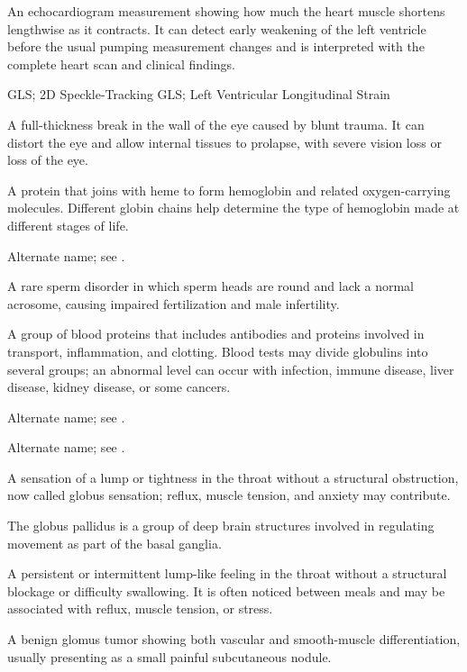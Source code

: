  An echocardiogram measurement showing how much the heart muscle shortens lengthwise as it contracts. It can detect early weakening of the left ventricle before the usual pumping measurement changes and is interpreted with the complete heart scan and clinical findings.

\synonyms
GLS; 2D Speckle-Tracking GLS; Left Ventricular Longitudinal Strain

 A full-thickness break in the wall of the eye caused by blunt trauma. It can distort the eye and allow internal tissues to prolapse, with severe vision loss or loss of the eye.

 A protein that joins with heme to form hemoglobin and related oxygen-carrying molecules. Different globin chains help determine the type of hemoglobin made at different stages of life.

 Alternate name; see .

 A rare sperm disorder in which sperm heads are round and lack a normal acrosome, causing impaired fertilization and male infertility.

 A group of blood proteins that includes antibodies and proteins involved in transport, inflammation, and clotting. Blood tests may divide globulins into several groups; an abnormal level can occur with infection, immune disease, liver disease, kidney disease, or some cancers.

 Alternate name; see .

 Alternate name; see .

 A sensation of a lump or tightness in the throat without a structural obstruction, now called globus sensation; reflux, muscle tension, and anxiety may contribute.

 The globus pallidus is a group of deep brain structures involved in regulating movement as part of the basal ganglia.

 A persistent or intermittent lump-like feeling in the throat without a structural blockage or difficulty swallowing. It is often noticed between meals and may be associated with reflux, muscle tension, or stress.

 A benign glomus tumor showing both vascular and smooth-muscle differentiation, usually presenting as a small painful subcutaneous nodule.

